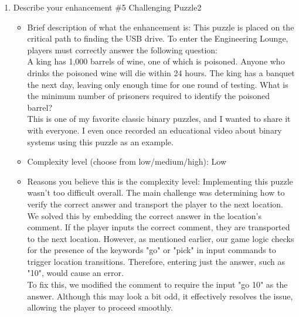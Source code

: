 \documentclass[11pt]{article}
\begin{document}
\begin{enumerate}
   \item Describe your enhancement \#5 Challenging Puzzle2
    \begin{itemize}
        \item Brief description of what the enhancement is: This puzzle is placed on the critical path to finding the USB drive. To enter the Engineering Lounge, players must correctly answer the following question: \\
        A king has 1,000 barrels of wine, one of which is poisoned. Anyone who drinks the poisoned wine will die within 24 hours. The king has a banquet the next day, leaving only enough time for one round of testing. What is the minimum number of prisoners required to identify the poisoned barrel?\\      
        This is one of my favorite classic binary puzzles, and I wanted to share it with everyone. I even once recorded an educational video about binary systems using this puzzle as an example.
        \item Complexity level (choose from low/medium/high): Low
        \item Reasons you believe this is the complexity level: Implementing this puzzle wasn't too difficult overall. The main challenge was determining how to verify the correct answer and transport the player to the next location. We solved this by embedding the correct answer in the location's comment. If the player inputs the correct comment, they are transported to the next location. However, as mentioned earlier, our game logic checks for the presence of the keywords "go" or "pick" in input commands to trigger location transitions. Therefore, entering just the answer, such as "10", would cause an error.\\
        To fix this, we modified the comment to require the input "go 10" as the answer. Although this may look a bit odd, it effectively resolves the issue, allowing the player to proceed smoothly.
    \end{itemize}    
\end{enumerate}
\end{document}
